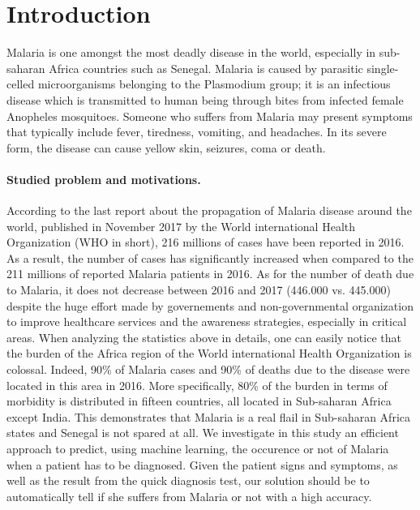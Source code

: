 \section{Introduction}\label{intro}
Malaria is one amongst the most deadly disease in the world, especially in sub-saharan Africa countries such as Senegal.
Malaria is caused by parasitic single-celled microorganisms belonging to the Plasmodium group; it is an infectious
disease which is transmitted to human being through bites from infected female Anopheles mosquitoes. Someone who suffers
from  Malaria may present symptoms that typically include fever, tiredness, vomiting, and headaches. In its severe form,
the disease can cause yellow skin, seizures, coma or death.

\paragraph*{Studied problem and motivations.}
According to the last report \cite{Wh17}  about the propagation of Malaria disease around the world, published in November 2017 by the World international Health Organization (WHO in short),
 216 millions of cases have been reported in 2016. As a result, the number of cases has significantly increased when compared to the 211 millions of reported Malaria patients in 2016.
As for the number of death due to Malaria, it does not decrease between 2016 and 2017 (446.000 vs. 445.000) despite the huge effort made by governements
and non-governmental organization to improve healthcare services and the awareness strategies, especially in critical areas. 
When analyzing the statistics above in details, one can easily notice that the burden of the Africa region of the World 
international Health Organization is colossal. Indeed, 90\% of Malaria cases and 90\% of deaths due to the disease were located in this area in 2016.
More specifically, 80\% of the burden in terms of morbidity is distributed in fifteen countries, all located in Sub-saharan Africa except India. This demonstrates
that Malaria is a real flail in Sub-saharan Africa states and Senegal is not spared at all. We investigate in this study an efficient approach to predict, using machine learning, the occurence 
or not of Malaria when a patient has to be diagnosed. Given the patient signs and symptoms, as well as the result from the quick diagnosis test, our solution should be to 
automatically tell if she suffers from Malaria or not with a high accuracy.

